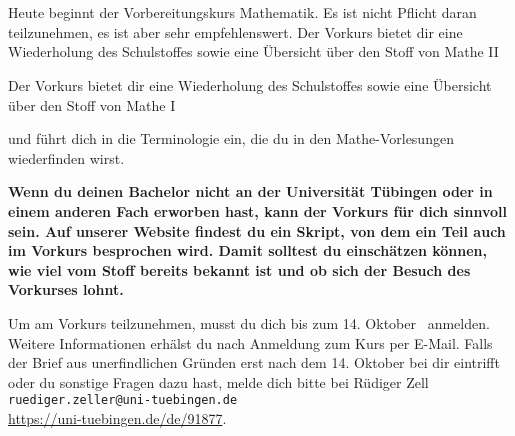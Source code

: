 \begin{description}
%
%
    \fi
\fi

\ifml
	\item~ %
\else
    \item[Montag, 19. Oktober \YEAR]\ \\
  Heute beginnt der Vorbereitungskurs Mathematik. Es ist nicht Pflicht daran teilzunehmen,
	es ist aber sehr empfehlenswert.
	\ifsommersemester
	Der Vorkurs bietet dir eine Wiederholung des Schulstoffes sowie eine Übersicht über den Stoff von Mathe II
	\fi
	
	\ifwintersemester
	Der Vorkurs bietet dir eine Wiederholung des Schulstoffes sowie eine Übersicht über den Stoff von Mathe I
	\fi
	
	und führt dich in die Terminologie ein, die du in den Mathe-Vorlesungen wiederfinden wirst.
	
	\ifmaster
	\textbf{Wenn du deinen Bachelor nicht an der Universität Tübingen oder in einem anderen Fach erworben hast, kann der Vorkurs für dich sinnvoll sein. Auf unserer Website findest du ein Skript, von dem ein Teil auch im Vorkurs besprochen wird. Damit solltest du einschätzen können, wie viel vom Stoff bereits bekannt ist und ob sich der Besuch des Vorkurses lohnt.}
	\fi
	
    Um am Vorkurs teilzunehmen, musst du dich bis zum 14. Oktober \YEAR~anmelden. Weitere Informationen erhälst du nach Anmeldung zum Kurs per E-Mail. Falls der Brief aus unerfindlichen Gründen erst nach dem 14. Oktober bei dir eintrifft oder du sonstige Fragen dazu hast, melde dich bitte bei Rüdiger Zell \texttt{ruediger.zeller@uni-tuebingen.de}\\
    \url{https://uni-tuebingen.de/de/91877}.


\end{description}
